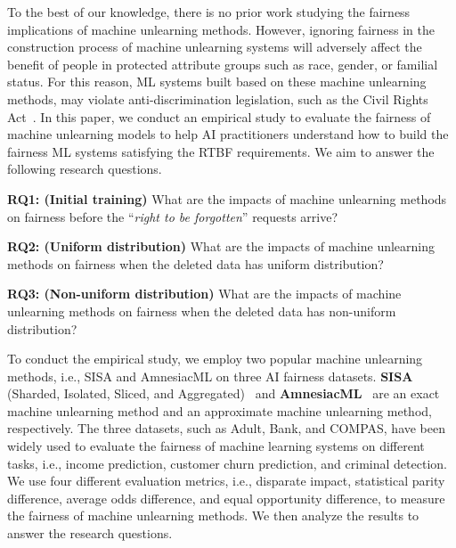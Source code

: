 To the best of our knowledge, there is no prior work studying the fairness implications of machine unlearning methods.
However, ignoring fairness in the construction process of machine unlearning systems will adversely affect the benefit of people in  protected attribute groups such as race, gender, or familial status. For this reason, ML
systems built based on these machine unlearning methods, may violate anti-discrimination legislation, such as the Civil Rights Act~\cite{murakawa2014first}. In this paper, we conduct an empirical study to evaluate the fairness of machine unlearning models to help AI practitioners understand how to build the fairness ML systems satisfying the RTBF requirements. We aim to answer the following research questions.  

\noindent \textbf{RQ1: (Initial training)} What are the impacts of machine unlearning methods on fairness before the ``\textit{right to be forgotten}'' requests arrive?

\noindent \textbf{RQ2: (Uniform distribution)} What are the impacts of machine unlearning methods on fairness when the deleted data has uniform distribution?

\noindent \textbf{RQ3: (Non-uniform distribution)} What are the impacts of machine unlearning methods on fairness when the deleted data has non-uniform distribution?

To conduct the empirical study, we employ two popular machine unlearning methods, i.e., SISA and AmnesiacML on three AI fairness datasets.
\textbf{SISA} (Sharded, Isolated, Sliced, and Aggregated)~\cite{sisa} and \textbf{AmnesiacML}~\cite{amnesiac} are an exact machine unlearning method and an approximate machine unlearning method, respectively.
The three datasets, such as Adult, Bank, and COMPAS, have been widely used to evaluate the fairness of machine learning systems on different tasks, i.e., income prediction, customer churn prediction, and criminal detection. We use four different evaluation metrics, i.e., disparate impact, statistical parity difference, average odds difference, and equal opportunity difference, to measure the fairness of machine unlearning methods. We then analyze the results to answer the research questions. 


